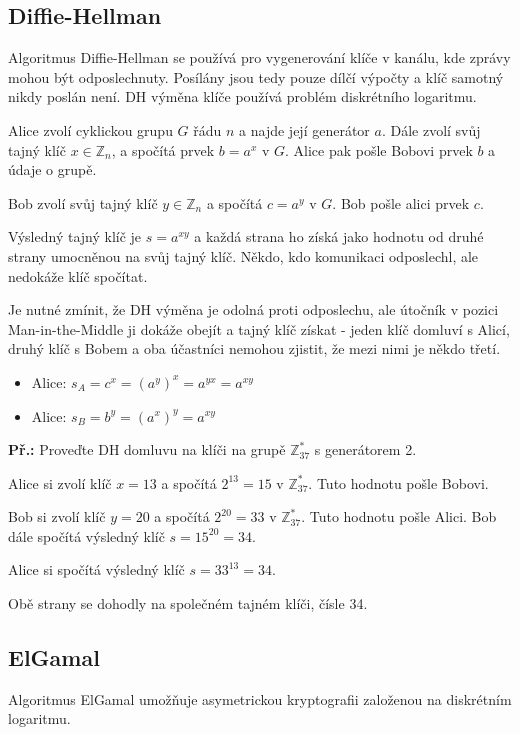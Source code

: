 \documentclass[10pt,a4paper]{article}
\begin{document}
\subsection{Diffie-Hellman}

Algoritmus Diffie-Hellman se používá pro vygenerování klíče v kanálu, kde zprávy
mohou být odposlechnuty. Posílány jsou tedy pouze dílčí výpočty a klíč samotný
nikdy poslán není. DH výměna klíče používá problém diskrétního logaritmu.

Alice zvolí cyklickou grupu $G$ řádu $n$ a najde její generátor $a$. Dále zvolí
svůj tajný klíč $x \in \mathbb{Z}_n$, a spočítá prvek $b = a^x$ v $G$. Alice pak
pošle Bobovi prvek $b$ a údaje o grupě.

Bob zvolí svůj tajný klíč $y \in \mathbb{Z}_n$ a spočítá $c = a^y$ v $G$. Bob
pošle alici prvek $c$.

Výsledný tajný klíč je $s = a^{xy}$ a každá strana ho získá jako hodnotu od
druhé strany umocněnou na svůj tajný klíč. Někdo, kdo komunikaci odposlechl, ale
nedokáže klíč spočítat.

Je nutné zmínit, že DH výměna je odolná proti odposlechu, ale útočník v pozici
Man-in-the-Middle ji dokáže obejít a tajný klíč získat - jeden klíč domluví s
Alicí, druhý klíč s Bobem a oba účastníci nemohou zjistit, že mezi nimi je někdo
třetí.

\begin{itemize}
    \item Alice: $s_A = c^x = (a^y)^x = a^{yx} = a^{xy}$
    \item Alice: $s_B = b^y = (a^x)^y = a^{xy}$
\end{itemize}

\begin{exercise}
    \textbf{Př.:} Proveďte DH domluvu na klíči na grupě $\mathbb{Z}_{37}^*$ s
    generátorem 2.

    Alice si zvolí klíč $x = 13$ a spočítá $2^{13} = 15$ v $\mathbb{Z}_{37}^*$. Tuto
    hodnotu pošle Bobovi.

    Bob si zvolí klíč $y = 20$ a spočítá $2^{20} = 33$ v $\mathbb{Z}_{37}^*$. Tuto
    hodnotu pošle Alici. Bob dále spočítá výsledný klíč $s = 15^{20} = 34$.

    Alice si spočítá výsledný klíč $s = 33^{13} = 34$.

    Obě strany se dohodly na společném tajném klíči, čísle 34.

\end{exercise}

\subsection{ElGamal}
Algoritmus ElGamal umožňuje asymetrickou kryptografii založenou na diskrétním
logaritmu.
\end{document}
